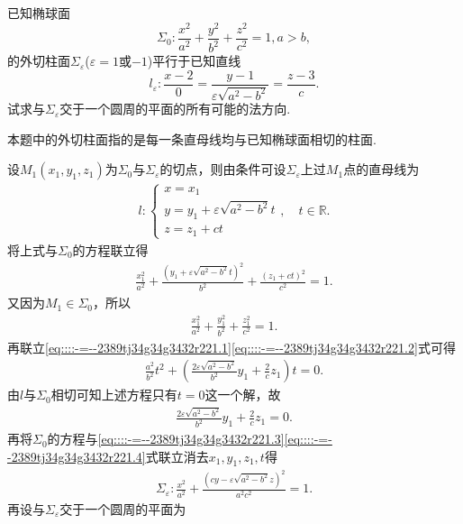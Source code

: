 \documentclass[../../main.tex]{subfiles}%
\begin{document}
\begin{example}
已知椭球面
$$
\Sigma_0:\frac{x^2}{a^2}+\frac{y^2}{b^2}+\frac{z^2}{c^2}=1,a>b,$$
的外切柱面$\Sigma_\varepsilon$($\varepsilon=1$或$-1$)平行于已知直线
$$
l_\varepsilon:\frac{x-2}{0}=\frac{y-1}{\varepsilon\sqrt{a^2-b^2}}=\frac{z-3}{c}.
$$
试求与$\Sigma_\varepsilon$交于一个圆周的平面的所有可能的法方向.
\end{example}
\begin{remark}
本题中的外切柱面指的是每一条直母线均与已知椭球面相切的柱面.
\end{remark}
\begin{solution}
设$M_1(x_1,y_1,z_1)$为$\Sigma_0$与$\Sigma_\varepsilon$的切点，则由条件可设$\Sigma_\varepsilon$上过$M_1$点的直母线为
\begin{align}
l:\begin{cases}
x=x_1\\
y=y_1+\varepsilon \sqrt{a^2-b^2}t\\
z=z_1+ct
\end{cases}, \quad t\in \mathbb{R}. \label{eq::::-=--2389tj34g34g3432r221.4}
\end{align}
将上式与$\Sigma_0$的方程联立得
\begin{align}
\frac{x_1^2}{a^2}+\frac{(y_1+\varepsilon \sqrt{a^2-b^2}t)^2}{b^2}+\frac{(z_1+ct)^2}{c^2}=1. \label{eq::::-=--2389tj34g34g3432r221.1}
\end{align}
又因为$M_1\in \Sigma_0$，所以
\begin{align}
\frac{x_1^2}{a^2}+\frac{y_1^2}{b^2}+\frac{z_1^2}{c^2}=1. \label{eq::::-=--2389tj34g34g3432r221.2}
\end{align}
再联立\eqref{eq::::-=--2389tj34g34g3432r221.1}\eqref{eq::::-=--2389tj34g34g3432r221.2}式可得
\begin{align*}
\frac{a^2}{b^2}t^2+\left( \frac{2\varepsilon \sqrt{a^2-b^2}}{b^2}y_1+\frac{2}{c}z_1 \right) t=0.
\end{align*}
由$l$与$\Sigma_0$相切可知上述方程只有$t=0$这一个解，故
\begin{align}
\frac{2\varepsilon \sqrt{a^2-b^2}}{b^2}y_1+\frac{2}{c}z_1=0. \label{eq::::-=--2389tj34g34g3432r221.3}
\end{align}
再将$\Sigma_0$的方程与\eqref{eq::::-=--2389tj34g34g3432r221.3}\eqref{eq::::-=--2389tj34g34g3432r221.4}式联立消去$x_1,y_1,z_1,t$得
\begin{align*}
\Sigma_\varepsilon:\frac{x^2}{a^2}+\frac{(cy-\varepsilon \sqrt{a^2-b^2}z)^2}{a^2c^2}=1.
\end{align*}
再设与$\Sigma_\varepsilon$交于一个圆周的平面为

\end{solution}
\end{document}
